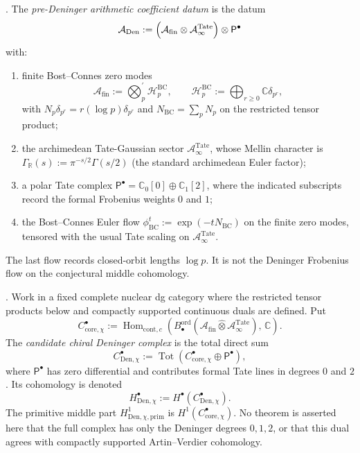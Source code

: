 \begin{definition}
\label{v4-arith:3d-acs:def:deninger-enhanced-algebra}
\ClaimStatusDefinitional. The \emph{pre-Deninger arithmetic
coefficient datum} is the datum
\[
\mathcal A_{\mathrm{Den}}
:=
\Bigl(\mathcal A_{\mathrm{fin}}\otimes
\mathcal A_{\infty}^{\mathrm{Tate}}\Bigr)\otimes \mathsf P^{\bullet}
\]
with:
\begin{enumerate}
\item finite Bost--Connes zero modes
\[
\mathcal A_{\mathrm{fin}}
:=\bigotimes_{p}^{\prime}\mathcal H_{p}^{\mathrm{BC}},
\qquad
\mathcal H_{p}^{\mathrm{BC}}
:=\bigoplus_{r\geq0}\mathbb C\delta_{p^{r}},
\]
with \(N_{p}\delta_{p^{r}}=r(\log p)\delta_{p^{r}}\) and
\(N_{\mathrm{BC}}=\sum_{p}N_{p}\) on the restricted tensor product;
\item the archimedean Tate-Gaussian sector
\(\mathcal A_{\infty}^{\mathrm{Tate}}\), whose Mellin character is
\(\Gamma_{\mathbb R}(s):=\pi^{-s/2}\Gamma(s/2)\) (the standard
archimedean Euler factor);
\item a polar Tate complex
\(\mathsf P^{\bullet}=\mathbb C_{0}[0]\oplus\mathbb C_{1}[2]\),
where the indicated subscripts record the formal Frobenius weights
\(0\) and \(1\);
\item the Bost--Connes Euler flow
\(\phi_{\mathrm{BC}}^{t}:=\exp(-tN_{\mathrm{BC}})\) on the finite
zero modes, tensored with the usual Tate scaling on
\(\mathcal A_{\infty}^{\mathrm{Tate}}\).
\end{enumerate}
The last flow records closed-orbit lengths \(\log p\). It is not the
Deninger Frobenius flow on the conjectural middle cohomology.
\end{definition}

\begin{definition}
\label{v4-arith:3d-acs:def:chiral-deninger-complex}
\ClaimStatusDefinitional. Work in a fixed complete nuclear dg category
where the restricted tensor products below and compactly supported
continuous duals are defined. Put
\[
C_{\mathrm{core},\chi}^{\bullet}
:=
\operatorname{Hom}_{\mathrm{cont},c}\!\left(
B^{\mathrm{ord}}_{\bullet}(\mathcal A_{\mathrm{fin}}\widehat{\otimes}
\mathcal A_{\infty}^{\mathrm{Tate}}),\,\mathbb C\right).
\]
The \emph{candidate chiral Deninger complex} is the total direct sum
\[
C_{\mathrm{Den},\chi}^{\bullet}
:=
\operatorname{Tot}\!\left(
C_{\mathrm{core},\chi}^{\bullet}\oplus\mathsf P^{\bullet}\right),
\]
where \(\mathsf P^{\bullet}\) has zero differential and contributes
formal Tate lines in degrees \(0\) and \(2\).
Its cohomology is denoted
\[
H_{\mathrm{Den},\chi}^{\bullet}
:=H^{\bullet}(C_{\mathrm{Den},\chi}^{\bullet}).
\]
The primitive middle part \(H_{\mathrm{Den},\chi,\mathrm{prim}}^{1}\)
is \(H^{1}(C_{\mathrm{core},\chi}^{\bullet})\). No theorem is asserted
here that the full complex has only the Deninger degrees \(0,1,2\), or
that this dual agrees with compactly supported Artin--Verdier
cohomology.
\end{definition}

